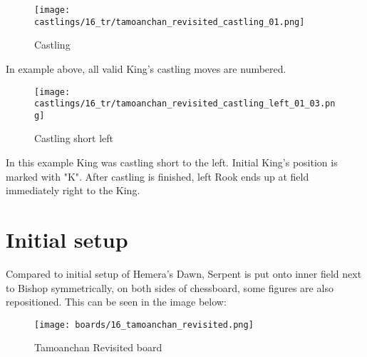 \noindent
\begin{figure}[!h]
\texttt{[image: castlings/16\_tr/tamoanchan\_revisited\_castling\_01.png]}
\caption{Castling}
\label{fig:tamoanchan_revisited_castling_01}
\end{figure}

In example above, all valid King's castling moves are numbered.

\noindent
\begin{figure}[!h]
\texttt{[image: castlings/16\_tr/tamoanchan\_revisited\_castling\_left\_01\_03.png]}
\caption{Castling short left}
\label{fig:tamoanchan_revisited_castling_left_01_03}
\end{figure}

In this example King was castling short to the left. Initial King's position is
marked with "K". After castling is finished, left Rook ends up at field immediately
right to the King.

\clearpage %

\section*{Initial setup}
\label{sec:Tamoanchan Revisited/Initial setup}

Compared to initial setup of Hemera's Dawn, Serpent is put onto inner field next
to Bishop symmetrically, on both sides of chessboard, some figures are also
repositioned. This can be seen in the image below:

\noindent
\begin{figure}[h]
\texttt{[image: boards/16\_tamoanchan\_revisited.png]}
\caption{Tamoanchan Revisited board}
\label{fig:16_tamoanchan_revisited}
\end{figure}

\clearpage %
